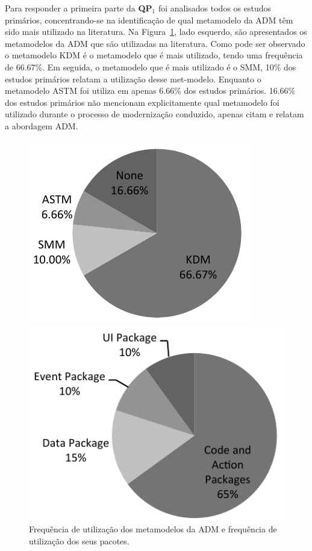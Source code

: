 Para responder a primeira parte da \textbf{QP$_1$} foi analisados todos os estudos primários, concentrando-se na identificação de qual metamodelo da ADM têm sido mais utilizado na literatura. Na Figura~\ref{fig:frequencia_kdm_packages}, lado esquerdo, são apresentados os metamodelos da ADM que são utilizadas na literatura. Como pode ser observado o metamodelo KDM é o metamodelo que é mais utilizado, tendo uma frequência de 66.67\%. Em seguida, o metamodelo que é mais utilizado é o SMM, 10\% dos estudos primários relatam a utilização desse met-modelo. Enquanto o metamodelo ASTM foi utiliza em apenas 6.66\% dos estudos primários. 16.66\% dos estudos primários não mencionam explicitamente qual metamodelo foi utilizado durante o processo de modernização conduzido, apenas citam e relatam a abordagem ADM.

\begin{figure}[!h]
\caption{Frequência de utilização dos metamodelos da ADM e frequência de utilização dos seus pacotes.}
 \label{fig:frequencia_kdm_packages}
\centering
\begin{minipage}{.5\textwidth}
  \centering
  \includegraphics[scale=0.9]{images/MetamodelosDIstribuition}
\end{minipage}%
\begin{minipage}{.5\textwidth}
  \centering
  \includegraphics[scale=0.9]{images/PacotesKDM}
\end{minipage}
\fautor
\end{figure}

